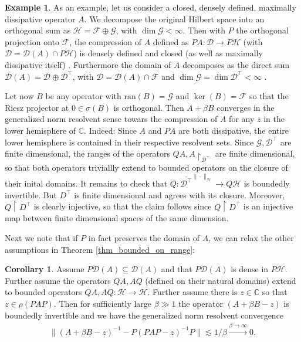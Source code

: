 \documentclass[reqno,12pt,letterpaper]{amsart}
\numberwithin{equation}{section}
\newcommand{\1}{\mathds{1}}
\theoremstyle{definition}
\newtheorem{Ex}[Th]{Example}
\newtheorem{Cor}[Th]{Corollary}
\begin{document}
\begin{Ex}\label{compressed_example_II}
As an example, let us consider a closed, densely defined,  maximally dissipative  operator $A$. We decompose the original Hilbert space into an orthogonal sum as $\mathcal{H} = \mathcal{F} \oplus \mathcal{G}$, with $\dim \mathcal{G} < \infty$. Then with $P$ the orthogonal projection onto $\mathcal{F}$, the compression of $A$ defined as $PA: \mathcal{D} \rightarrow P\mathcal{H}$ (with $\mathcal{D} = \mathcal{D}(A) \cap P\mathcal{H}$) is densely defined and closed (as well as maximally dissipative itself) \cite[Theorem 2.2]{Nudelman2011}.  Furthermore
the domain of $A$ decomposes as the direct sum
$\mathcal{D}(A) = \mathcal{D} \oplus \mathcal{D}^\intercal$, with $\mathcal{D} = \mathcal{D}(A) \cap \mathcal{F}$ and $\dim \mathcal{G} = \dim\mathcal{D}^\intercal < \infty$ \cite{Nudelman2011}.

Let now $B$ be any operator with $ \text{ran}(B) = \mathcal{G}$ and  $\ker(B) = \mathcal{F}$  so that the Riesz projector at $0 \in \sigma(B)$ is orthogonal. 
 Then $A + \beta B $ converges in the generalized norm resolvent sense towars the compression of $A$ for any $z$ in the lower hemisphere of $\mathds{C}$. Indeed: Since $A$ and $PA$ are both dissipative, the entire lower hemisphere is contained in their respective resolvent sets. Since $\mathcal{G}, \mathcal{D}^\intercal$ are finite dimensional, the ranges of the operators $QA, A\restriction_{\mathcal{D}^\intercal}$ are finite dimensional, so that both operators triviallly extend to bounded operators on the closure of their inital domains. It remains to check that $Q:  \overline{\mathcal{D}^\intercal}^{\|\cdot\|_{\mathcal{H}}} \rightarrow Q \mathcal{H}$ is boundedly invertible. But $D^\intercal$ is finite dimensional and agrees with its closure. Moreover, $Q\restriction{D^\intercal} $ is clearly injective, so that the claim follows since $Q\restriction{D^\intercal} $ is an injective map between finite dimensional spaces of the same dimension.
\end{Ex}


Next we note that if $P$  in fact preserves the domain of $A$, we can relax the other assumptions in Theorem \ref{thm_bounded_on_range}:


\begin{Cor}\label{main_cor}
	 Assume $P \mathcal{D}(A) \subseteq \mathcal{D}(A)$ and that $P \mathcal{D}(A)$ is dense in $P\mathcal{H}$. Further assume the operators $QA, AQ$ (defined on their natural domains) extend to bounded operators $QA, AQ: \mathcal{H} \rightarrow \mathcal{H}$. Further assume there is $z \in \mathds{C}$ so that $z \in \rho(PAP)$.
	Then for sufficiently large $\beta \gg 1$ the operator $(A + \beta B - z)$ is boundedly invertible and we have the generalized norm resolvent convergence
		\begin{align}\label{convergence_preserved_domain_II}
		\|(A + \beta B - z)^{-1} - P(PAP -z)^{-1}P\| \lesssim 1/\beta \xrightarrow{\beta \rightarrow \infty} 0.
	\end{align}
\end{Cor}
\end{document}
